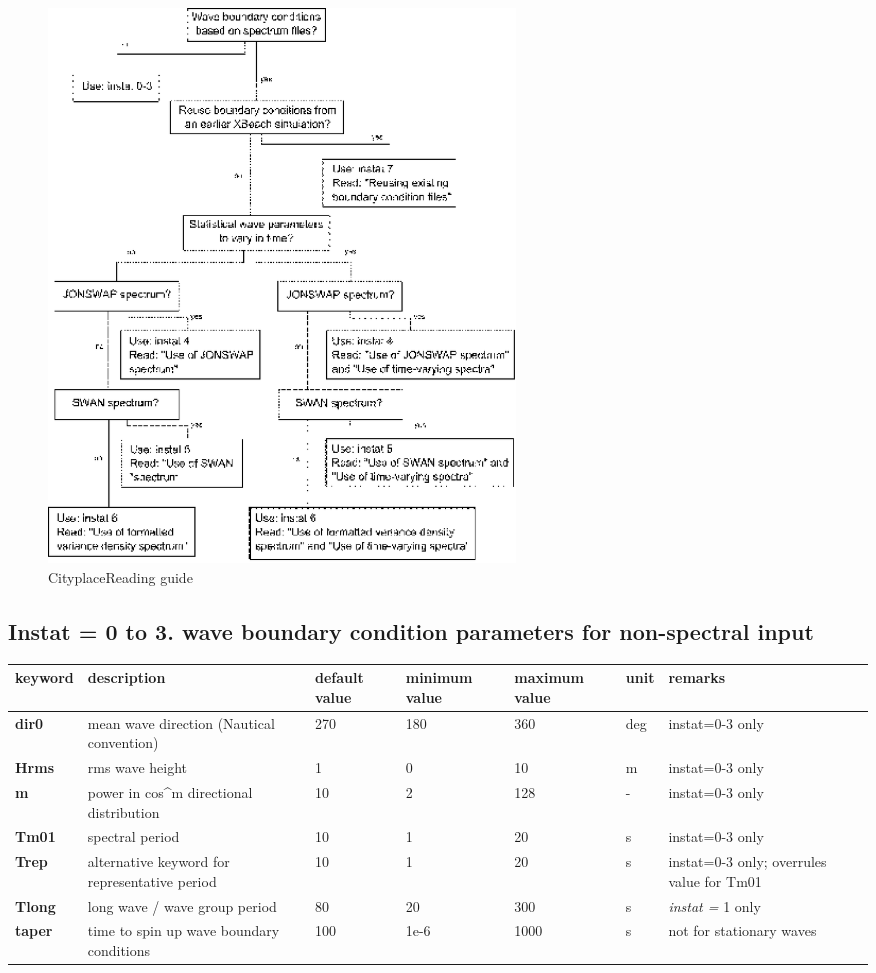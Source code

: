 \begin{figure}[h]
  \centering
  \includegraphics[width=0.6\textwidth]{image24}
  \caption{CityplaceReading guide}
  \label{fig:image24}
\end{figure}

\subsection{ Instat = 0 to 3. wave boundary condition parameters for non-spectral input}

\begin{tabular}{|p{0.5in}|p{1.1in}|p{0.4in}|p{0.5in}|p{0.5in}|p{0.3in}|p{0.7in}|} \hline 
keyword & description & default value & minimum value & maximum value & unit & remarks \\ \hline 
\textbf{dir0  } & mean wave direction (Nautical convention) & 270 & 180 & 360 & deg & instat=0-3 only \\ \hline 
\textbf{Hrms  } & rms wave height & 1 & 0 & 10 & m & instat=0-3 only \\ \hline 
\textbf{m     } & power in cos\^{}m directional distribution & 10 & 2 & 128 & - & instat=0-3 only \\ \hline 
\textbf{Tm01  } & spectral period & 10 & 1 & 20 & s & instat=0-3 only \\ \hline 
\textbf{Trep} & alternative keyword for representative period & 10 & 1 & 20 & s & instat=0-3 only; overrules value for Tm01 \\ \hline 
\textbf{Tlong } & long wave / wave group period & 80 & 20 & 300 & s & \textit{instat =} 1 only \\ \hline 
\textbf{taper    } & time to spin up wave boundary conditions & 100 & 1e-6 & 1000 & s & not for stationary waves \\ \hline 
\end{tabular}
